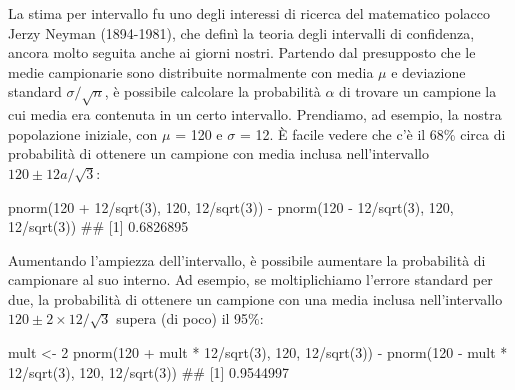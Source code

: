 \documentclass[a4paper,12pt,oneside]{book}
\newenvironment{Shaded}{\begin{snugshade}}{\end{snugshade}}
\newcommand{\DecValTok}[1]{#1}
\newcommand{\SpecialCharTok}[1]{#1}
\newcommand{\DocumentationTok}[1]{#1}
\newcommand{\OtherTok}[1]{#1}
\newcommand{\FunctionTok}[1]{#1}
\newcommand{\NormalTok}[1]{#1}
\begin{document}
La stima per intervallo fu uno degli interessi di ricerca del matematico polacco Jerzy Neyman (1894-1981), che definì la teoria degli intervalli di confidenza, ancora molto seguita anche ai giorni nostri. Partendo dal presupposto che le medie campionarie sono distribuite normalmente con media \(\mu\) e deviazione standard \(\sigma/\sqrt{n}\), è possibile calcolare la probabilità \(\alpha\) di trovare un campione la cui media era contenuta in un certo intervallo. Prendiamo, ad esempio, la nostra popolazione iniziale, con \(\mu\) = 120 e \(\sigma\) = 12. È facile vedere che c'è il 68\% circa di probabilità di ottenere un campione con media inclusa nell'intervallo \(120 \pm 12a/\sqrt{3}\):

\begin{Shaded}
\begin{Highlighting}[]
\FunctionTok{pnorm}\NormalTok{(}\DecValTok{120} \SpecialCharTok{+} \DecValTok{12}\SpecialCharTok{/}\FunctionTok{sqrt}\NormalTok{(}\DecValTok{3}\NormalTok{), }\DecValTok{120}\NormalTok{, }\DecValTok{12}\SpecialCharTok{/}\FunctionTok{sqrt}\NormalTok{(}\DecValTok{3}\NormalTok{)) }\SpecialCharTok{{-}} 
  \FunctionTok{pnorm}\NormalTok{(}\DecValTok{120} \SpecialCharTok{{-}} \DecValTok{12}\SpecialCharTok{/}\FunctionTok{sqrt}\NormalTok{(}\DecValTok{3}\NormalTok{), }\DecValTok{120}\NormalTok{, }\DecValTok{12}\SpecialCharTok{/}\FunctionTok{sqrt}\NormalTok{(}\DecValTok{3}\NormalTok{))}
\DocumentationTok{\#\# [1] 0.6826895}
\end{Highlighting}
\end{Shaded}

Aumentando l'ampiezza dell'intervallo, è possibile aumentare la probabilità di campionare al suo interno. Ad esempio, se moltiplichiamo l'errore standard per due, la probabilità di ottenere un campione con una media inclusa nell'intervallo \(120 \pm 2 \times 12/\sqrt{3}\) supera (di poco) il 95\%:

\begin{Shaded}
\begin{Highlighting}[]
\NormalTok{mult }\OtherTok{\textless{}{-}} \DecValTok{2}
\FunctionTok{pnorm}\NormalTok{(}\DecValTok{120} \SpecialCharTok{+}\NormalTok{ mult }\SpecialCharTok{*} \DecValTok{12}\SpecialCharTok{/}\FunctionTok{sqrt}\NormalTok{(}\DecValTok{3}\NormalTok{), }\DecValTok{120}\NormalTok{, }\DecValTok{12}\SpecialCharTok{/}\FunctionTok{sqrt}\NormalTok{(}\DecValTok{3}\NormalTok{)) }\SpecialCharTok{{-}} 
  \FunctionTok{pnorm}\NormalTok{(}\DecValTok{120} \SpecialCharTok{{-}}\NormalTok{ mult }\SpecialCharTok{*} \DecValTok{12}\SpecialCharTok{/}\FunctionTok{sqrt}\NormalTok{(}\DecValTok{3}\NormalTok{), }\DecValTok{120}\NormalTok{, }\DecValTok{12}\SpecialCharTok{/}\FunctionTok{sqrt}\NormalTok{(}\DecValTok{3}\NormalTok{))}
\DocumentationTok{\#\# [1] 0.9544997}
\end{Highlighting}
\end{Shaded}
\end{document}
